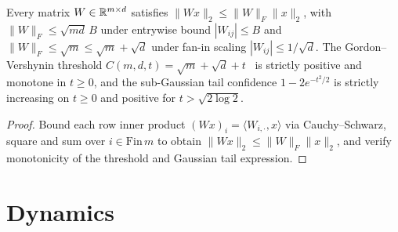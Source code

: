 \begin{lemma}\label{lem:gaussian_operator_norm}
\leanok
{}
Every matrix $W\in\mathbb{R}^{m\times d}$ satisfies $\|Wx\|_2 \le \|W\|_F\|x\|_2$, with $\|W\|_F \le \sqrt{md}\,B$ under entrywise bound $|W_{ij}|\le B$ and $\|W\|_F \le \sqrt{m} \le \sqrt{m}+\sqrt{d}$ under fan-in scaling $|W_{ij}|\le 1/\sqrt{d}$. The Gordon--Vershynin threshold $C(m,d,t) = \sqrt{m}+\sqrt{d}+t$~\cite{vershynin2018high} is strictly positive and monotone in $t\ge 0$, and the sub-Gaussian tail confidence $1 - 2e^{-t^2/2}$ is strictly increasing on $t\ge 0$ and positive for $t > \sqrt{2\log 2}$.
\end{lemma}
\begin{proof}
\leanok
Bound each row inner product $(Wx)_i = \langle W_{i,\cdot}, x\rangle$ via Cauchy--Schwarz, square and sum over $i\in\mathrm{Fin}\,m$ to obtain $\|Wx\|_2 \le \|W\|_F\|x\|_2$, and verify monotonicity of the threshold and Gaussian tail expression.
\end{proof}

\chapter{Dynamics}

